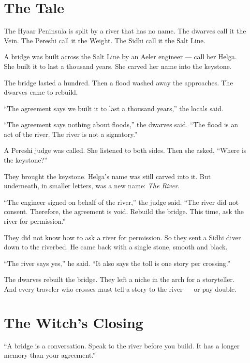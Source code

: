 \documentclass[10pt,twoside]{book}
\begin{document}
\section*{The Tale}
The Hyaar Peninsula is split by a river that has no name. The dwarves call it the Vein. The Pereshi call it the Weight. The Sidhi call it the Salt Line.

A bridge was built across the Salt Line by an Aeler engineer --- call her Helga. She built it to last a thousand years. She carved her name into the keystone.

The bridge lasted a hundred. Then a flood washed away the approaches. The dwarves came to rebuild.

``The agreement says we built it to last a thousand years,'' the locals said.

``The agreement says nothing about floods,'' the dwarves said. ``The flood is an act of the river. The river is not a signatory.''

A Pereshi judge was called. She listened to both sides. Then she asked, ``Where is the keystone?''

They brought the keystone. Helga's name was still carved into it. But underneath, in smaller letters, was a new name: \textit{The River}.

``The engineer signed on behalf of the river,'' the judge said. ``The river did not consent. Therefore, the agreement is void. Rebuild the bridge. This time, ask the river for permission.''

They did not know how to ask a river for permission. So they sent a Sidhi diver down to the riverbed. He came back with a single stone, smooth and black.

``The river says yes,'' he said. ``It also says the toll is one story per crossing.''

The dwarves rebuilt the bridge. They left a niche in the arch for a storyteller. And every traveler who crosses must tell a story to the river --- or pay double.

\section*{The Witch's Closing}
``A bridge is a conversation. Speak to the river before you build. It has a longer memory than your agreement.''
\end{document}
